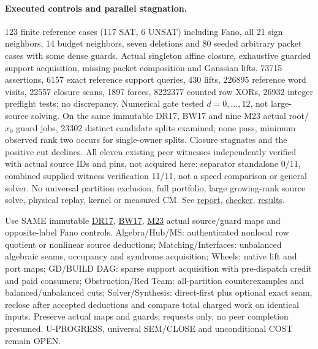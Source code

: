 \documentclass[11pt]{article}
\begin{document}
\paragraph{Executed controls and parallel stagnation.}
123 finite reference cases (117 SAT, 6 UNSAT) including Fano, all 21 sign neighbors, 14 budget neighbors, seven deletions and 80 seeded arbitrary packet cases with some dense guards. Actual singleton affine closure, exhaustive guarded support acquisition, missing-packet composition and Gaussian lifts. 73715 assertions, 6157 exact reference support queries, 430 lifts, 226895 reference word visits, 22557 closure scans, 1897 forces, 8222377 counted row XORs, 26932 integer preflight tests; no discrepancy. Numerical gate tested $d=0,\ldots,12$, not large-source solving. On the same immutable DR17, BW17 and nine M23 actual root/$x_0$ guard jobs, 23302 distinct candidate splits examined; none pass, minimum observed rank two occurs for single-owner splits. Closure stagnates and the positive cut declines. All eleven existing peer witnesses independently verified with actual source IDs and pins, not acquired here: separator standalone 0/11, combined supplied witness verification 11/11, not a speed comparison or general solver. No universal partition exclusion, full portfolio, large growing-rank source solve, physical replay, kernel or measured CM. See \href{https://github.com/j15marti/pnp/commit/a1c112b7d51bb517e5dbb3f1a7a3c121195a0708}{report}, \href{https://github.com/j15marti/pnp/commit/84b2cda090d97c19981accec9c81537a41d2ad34}{checker}, \href{https://github.com/j15marti/pnp/commit/503472279209e709c48ac4293f87522672494b19}{results}.

Use SAME immutable \href{https://github.com/j15marti/pnp/commit/af8584879409ad3364795d50902f02b5a030bd2a}{DR17}, \href{https://github.com/j15marti/pnp/commit/9164cb11c6fcdf96d470de9d86b061e3201a591f}{BW17}, \href{https://github.com/j15marti/pnp/commit/a412bf23a0b63f03c886b7bf5bd50217b5502db2}{M23} actual source/guard maps and opposite-label Fano controls. Algebra/Hub/MS: authenticated nonlocal row quotient or nonlinear source deductions; Matching/Interfaces: unbalanced algebraic seams, occupancy and syndrome acquisition; Wheels: native lift and port maps; GD/BUILD DAG: sparse support acquisition with pre-dispatch credit and paid consumers; Obstruction/Red Team: all-partition counterexamples and balanced/unbalanced cuts; Solver/Synthesis: direct-first plus optional exact seam, reclose after accepted deductions and compare total charged work on identical inputs. Preserve actual maps and guards; requests only, no peer completion presumed. U-PROGRESS, universal SEM/CLOSE and unconditional COST remain OPEN.
\end{document}
